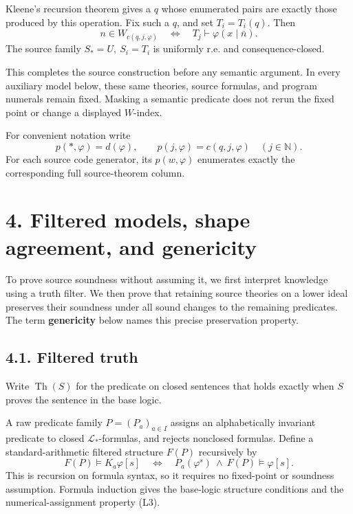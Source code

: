 \documentclass[
  11pt,
  letterpaper,
]{article}
\begin{document}
Kleene's recursion theorem gives a \(q\) whose enumerated pairs are
exactly those produced by this operation. Fix such a \(q\), and set
\(T_i=T_i(q)\). Then \[
n\in W_{c(q,j,\varphi)}
\quad\Longleftrightarrow\quad
T_j\vdash\varphi(x\mid\bar n).
\tag{S7}
\] The source family \(S_*=U,\ S_i=T_i\) is uniformly r.e. and
consequence-closed.

This completes the source construction before any semantic argument. In
every auxiliary model below, these same theories, source formulas, and
program numerals remain fixed. Masking a semantic predicate does not
rerun the fixed point or change a displayed \(W\)-index.

For convenient notation write \[
p(*,\varphi)=d(\varphi),\qquad
p(j,\varphi)=c(q,j,\varphi)\quad(j\in\mathbb N).
\tag{S8}
\] For each source code generator, its \(p(w,\varphi)\) enumerates
exactly the corresponding full source-theorem column.

\section{4. Filtered models, shape agreement, and
genericity}\label{filtered-models-shape-agreement-and-genericity}

To prove source soundness without assuming it, we first interpret
knowledge using a truth filter. We then prove that retaining source
theories on a lower ideal preserves their soundness under all sound
changes to the remaining predicates. The term \textbf{genericity} below
names this precise preservation property.

\subsection{4.1. Filtered truth}\label{filtered-truth}

Write \(\operatorname{Th}(S)\) for the predicate on closed sentences
that holds exactly when \(S\) proves the sentence in the base logic.

A raw predicate family \(P=(P_a)_{a\in I}\) assigns an alphabetically
invariant predicate to closed \(\mathcal L_*\)-formulas, and rejects
nonclosed formulas. Define a standard-arithmetic filtered structure
\(F(P)\) recursively by \[
F(P)\models K_a\varphi[s]
\quad\Longleftrightarrow\quad
P_a(\varphi^s)\ \land\ F(P)\models\varphi[s].
\tag{F1}
\] This is recursion on formula syntax, so it requires no fixed-point or
soundness assumption. Formula induction gives the base-logic structure
conditions and the numerical-assignment property (L3).
\end{document}
